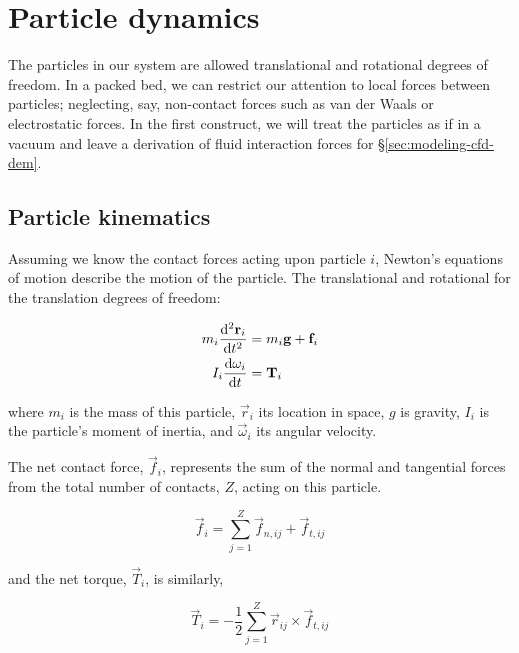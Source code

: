 \section{Particle dynamics}\label{sec:particle-dynamics}

The particles in our system are allowed translational and rotational degrees of freedom. In a packed bed, we can restrict our attention to local forces between particles; neglecting, say, non-contact forces such as van der Waals or electrostatic forces. In the first construct, we will treat the particles as if in a vacuum and leave a derivation of fluid interaction forces for \S\ref{sec:modeling-cfd-dem}.



\subsection{Particle kinematics}

Assuming we know the contact forces acting upon particle $i$, Newton's equations of motion describe the motion of the particle. The translational and rotational for the translation degrees of freedom:

\begin{subequations}
\label{eq:newtons-second}
\begin{align}
	m_i  \frac{\mathrm{d}^2{\mathbf{r}_i}}{\mathrm{d}t^2}   & = m_i\mathbf{g} + \mathbf{f}_i \label{eq:newton-translational} \\
	I_i\frac{\mathrm{d}{\mathbf{\omega}_i}}{\mathrm{d}t} & = \mathbf{T}_i \label{eq:newton-rotational}
\end{align}
\end{subequations}

where $m_i$ is the mass of this particle, $\vec{r}_i$ its location in space, $g$ is gravity, $I_i$ is the particle's moment of inertia, and $\vec{\omega}_i$ its angular velocity.

The net contact force, $\vec{f}_i$, represents the sum of the normal and tangential forces from the total number of contacts, $Z$, acting on this particle.

\begin{equation}
 	\vec{f}_i = \sum_{j=1}^{Z} \vec{f}_{n,ij} + \vec{f}_{t,ij}
 \end{equation} 

and the net torque, $\vec{T}_i$, is similarly,

\begin{equation}
	\vec{T}_i = -\frac{1}{2}\sum_{j=1}^{Z} \vec{r}_{ij} \times \vec{f}_{t,ij}
\end{equation}



